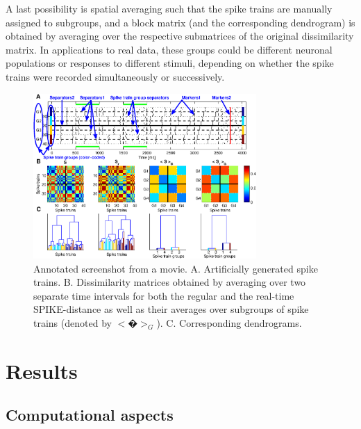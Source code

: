 \documentclass[10pt,twocolumn]{elsart5p}
\begin{document}
A last possibility is spatial averaging such that the spike trains are manually assigned to subgroups, and a block matrix (and the corresponding dendrogram) is obtained by averaging over the respective submatrices of the original dissimilarity matrix. In applications to real data, these groups could be different neuronal populations or responses to different stimuli, depending on whether the spike trains were recorded simultaneously or successively.
%
\begin{figure}
    \includegraphics[width=85mm]{Fig2-Movie-Screenshot.eps}
    \caption{\abb\label{fig:Fig2-Movie-Screenshot} Annotated screenshot from a movie.   A. Artificially generated spike trains.   B. Dissimilarity matrices obtained by averaging over two separate time intervals for both the regular and the real-time SPIKE-distance as well as their averages over subgroups of spike trains (denoted by $<�>_G$).   C. Corresponding dendrograms.}
\end{figure}






\section{\label{s:Results} Results}

\subsection{\label{ss:Computational-aspects} Computational aspects}
\end{document}
